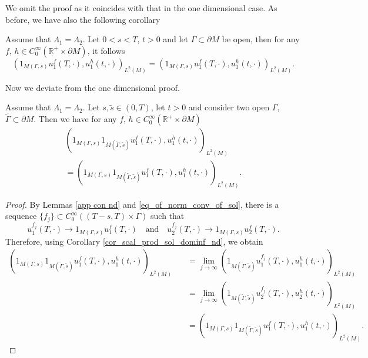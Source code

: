 \documentclass[12pt,oneside,final]{amsart}
\def\R{\mathbb R}
\begin{document}
We omit the proof as it coincides with that in the one dimensional case. As before, we have also the following corollary 

\begin{corollary}\label{cor_scal_prod_sol_dominf_nd}
Assume that $\Lambda_1 = \Lambda_2$.
	Let $0< s< T$, $t > 0$ and let $\Gamma\subset \partial M$ be open, then for any $f$, $h\in C_0^\infty(\R^+\times \partial M)$, it follows
	\begin{equation*}
		\left(1_{M(\Gamma,s)}u_1^f(T,\cdot), u_1^h(t,\cdot)\right)_{L^2(M)} = \left(1_{M(\Gamma,s)}u_1^f(T,\cdot), u_1^h(t,\cdot)\right)_{L^2(M)}.
	\end{equation*}
\end{corollary}

Now we deviate from the one dimensional proof.

\begin{corollary}\label{cor_scal_prod_sol_dominf_second}
Assume that $\Lambda_1 = \Lambda_2$.
	Let $s, \tilde s \in (0,T)$, let $t > 0$ and consider two open $\Gamma$, $\tilde{\Gamma}\subset \partial M$. Then we have for any $f$, $h\in C_0^\infty(\R^+\times \partial M)$
	\begin{multline*}
		\left(1_{M(\Gamma,s)} 1_{M(\tilde{\Gamma},\tilde{s})} u_1^f(T,\cdot), u_1^h(t,\cdot)\right)_{L^2(M)} \\
		= \left(1_{M(\Gamma,s)}1_{M(\tilde{\Gamma},\tilde{s})}u_1^f(T,\cdot), u_1^h(t,\cdot)\right)_{L^2(M)}.
	\end{multline*}
\end{corollary}

\begin{proof}
	By Lemmas \ref{app con nd} and \ref{eq_of_norm_conv_of_sol}, there is a sequence $\{f_j\} \subset C_0^\infty ((T-s, T)\times \Gamma)$ such that
	\begin{equation*}
		u_1^{f_j}(T,\cdot) \rightarrow 1_{M(\Gamma,s)} u_1^{f}(T,\cdot) \quad \text{and} \quad
		u_2^{f_j}(T,\cdot) \rightarrow 1_{M(\Gamma,s)} u_2^{f}(T,\cdot).
	\end{equation*}
	Therefore, using Corollary \ref{cor_scal_prod_sol_dominf_nd}, we obtain
	\begin{align*}
		\left(1_{M(\Gamma,s)} 1_{M(\tilde{\Gamma},\tilde{s})} u_1^f(T,\cdot),u_1^h(t,\cdot)\right)_{L^2(M)} &\quad =  \lim_{j\rightarrow \infty} \left(1_{M(\tilde{\Gamma},\tilde{s})}u_1^{f_j}(T,\cdot), u_1^h(t,\cdot)\right)_{L^2(M)}\\
		& \quad =\lim_{j\rightarrow \infty} \left(1_{M(\tilde{\Gamma},\tilde{s})} u_2^{f_j}(T,\cdot), u_2^h(t,\cdot)\right)_{L^2(M)}\\
		& \quad =\left(1_{M(\Gamma,s)} 1_{M(\tilde{\Gamma},\tilde{s})} u_1^f(T,\cdot), u_1^h(t,\cdot)\right)_{L^2(M)} .
	\end{align*}
\end{proof}
\end{document}
